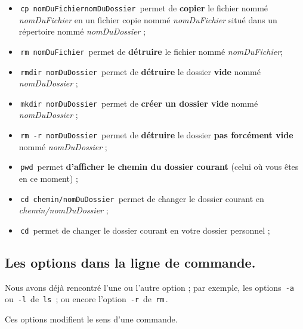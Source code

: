 \documentclass[11pt,a4paper]{article}
\begin{document}
\begin{itemize}
			\item \,\verb|cp nomDuFichiernomDuDossier|\, 
          permet de \textbf{copier} le fichier nomm\'e \textit{nomDuFichier}
          en un fichier copie  nomm\'e \textit{nomDuFichier} 
          situ\'e dans un r\'epertoire nomm\'e \textit{nomDuDossier} ; 
        
			\item \,\verb|rm nomDuFichier|\, 
          permet de \textbf{ d\'etruire } le fichier nomm\'e \textit{nomDuFichier}; 
        
			\item \,\verb|rmdir nomDuDossier|\, 
          permet de \textbf{d\'etruire} le dossier \textbf{vide} 
          nomm\'e \textit{nomDuDossier} ; 
        
			\item \,\verb|mkdir nomDuDossier|\, 
          permet de \textbf{cr\'eer un dossier vide} 
          nomm\'e \textit{nomDuDossier} ; 
        
			\item \,\verb|rm -r nomDuDossier|\, 
          permet de \textbf{d\'etruire} le dossier \textbf{pas forc\'ement vide} 
          nomm\'e \textit{nomDuDossier} ; 
        
			\item \,\verb|pwd|\, permet \textbf{d'afficher le chemin du dossier courant} 
          (celui o\`u vous \^etes en ce moment) ; 
        
			\item \,\verb|cd chemin/nomDuDossier|\, permet de changer le dossier 
          courant en \textit{chemin/nomDuDossier} ; 
        
			\item \,\verb|cd|\, permet de changer le dossier courant en votre dossier personnel ; 
        
					\end{itemize}
				\subsection{Les options dans la ligne de commande.}
				  Nous avons d\'ej\`a rencontr\'e l'une ou l'autre option ; 
				  par exemple, les options \,\verb|-a|\, 
				  ou \,\verb|-l|\, de \,\verb|ls|\, ;
				  ou encore l'option \,\verb|-r|\, de \,\verb|rm|\,.
        
            \par
        
				  Ces options modifient le sens d'une commande.
        
\end{document}
